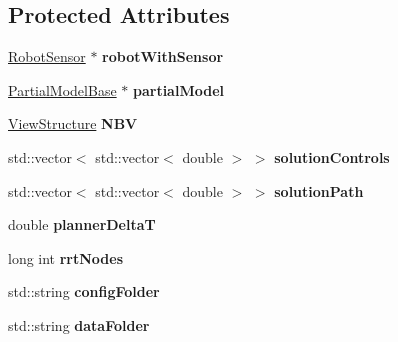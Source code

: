 \subsection*{Protected Attributes}
\begin{DoxyCompactItemize}
\item 
\hyperlink{classRobotSensor}{Robot\+Sensor} $\ast$ {\bfseries robot\+With\+Sensor}\hypertarget{classNBVPlanner_a6fec8a79d56dc35f51905ce2abeff0c6}{}\label{classNBVPlanner_a6fec8a79d56dc35f51905ce2abeff0c6}

\item 
\hyperlink{classPartialModelBase}{Partial\+Model\+Base} $\ast$ {\bfseries partial\+Model}\hypertarget{classNBVPlanner_a4e0ce42f393fed4546eee0249c71c7d4}{}\label{classNBVPlanner_a4e0ce42f393fed4546eee0249c71c7d4}

\item 
\hyperlink{classViewStructure}{View\+Structure} {\bfseries N\+BV}\hypertarget{classNBVPlanner_ac985d89444c084511403e5f5378dc125}{}\label{classNBVPlanner_ac985d89444c084511403e5f5378dc125}

\item 
std\+::vector$<$ std\+::vector$<$ double $>$ $>$ {\bfseries solution\+Controls}\hypertarget{classNBVPlanner_acebd542969897418dbdd03bd41e38dac}{}\label{classNBVPlanner_acebd542969897418dbdd03bd41e38dac}

\item 
std\+::vector$<$ std\+::vector$<$ double $>$ $>$ {\bfseries solution\+Path}\hypertarget{classNBVPlanner_acdc8f98e9d26646edec5c23fe391e980}{}\label{classNBVPlanner_acdc8f98e9d26646edec5c23fe391e980}

\item 
double {\bfseries planner\+DeltaT}\hypertarget{classNBVPlanner_a1ad75582b63a705ef2014ef6e6f550a2}{}\label{classNBVPlanner_a1ad75582b63a705ef2014ef6e6f550a2}

\item 
long int {\bfseries rrt\+Nodes}\hypertarget{classNBVPlanner_a824b421ac2e61a6f4636890198007f76}{}\label{classNBVPlanner_a824b421ac2e61a6f4636890198007f76}

\item 
std\+::string {\bfseries config\+Folder}\hypertarget{classNBVPlanner_a0d891b635bf4857e4a8cf6553d492b4b}{}\label{classNBVPlanner_a0d891b635bf4857e4a8cf6553d492b4b}

\item 
std\+::string {\bfseries data\+Folder}\hypertarget{classNBVPlanner_a12861032ba435a8bf036eaa9ca59584a}{}\label{classNBVPlanner_a12861032ba435a8bf036eaa9ca59584a}


\end{DoxyCompactItemize}
